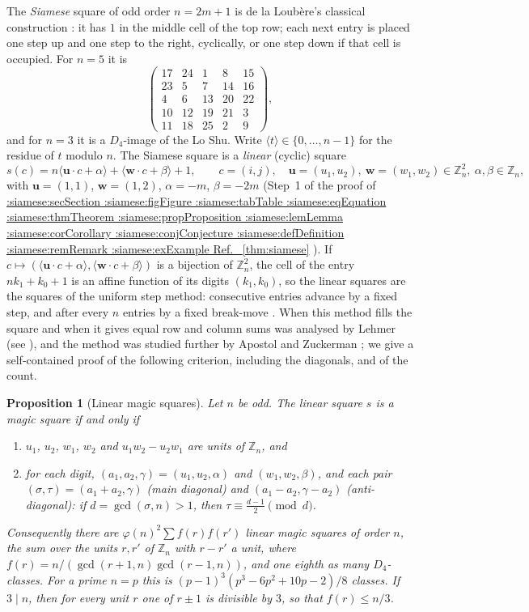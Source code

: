 \documentclass[11pt,a4paper]{article}
\makeatletter
\def\Cref@getprefix#1:#2\relax{#1}
\def\Cref@prefix@sec{sec}
\def\Cref@prefix@fig{fig}
\def\Cref@prefix@tab{tab}
\def\Cref@prefix@eq{eq}
\def\Cref@prefix@thm{thm}
\def\Cref@prefix@prop{prop}
\def\Cref@prefix@lem{lem}
\def\Cref@prefix@cor{cor}
\def\Cref@prefix@conj{conj}
\def\Cref@prefix@def{def}
\def\Cref@prefix@rem{rem}
\def\Cref@prefix@ex{ex}
\def\Cref@type@cap#1{%
  \edef\Cref@tmp{#1}%
  \ifx\Cref@tmp\Cref@prefix@sec Section%
  \else\ifx\Cref@tmp\Cref@prefix@fig Figure%
  \else\ifx\Cref@tmp\Cref@prefix@tab Table%
  \else\ifx\Cref@tmp\Cref@prefix@eq Equation%
  \else\ifx\Cref@tmp\Cref@prefix@thm Theorem%
  \else\ifx\Cref@tmp\Cref@prefix@prop Proposition%
  \else\ifx\Cref@tmp\Cref@prefix@lem Lemma%
  \else\ifx\Cref@tmp\Cref@prefix@cor Corollary%
  \else\ifx\Cref@tmp\Cref@prefix@conj Conjecture%
  \else\ifx\Cref@tmp\Cref@prefix@def Definition%
  \else\ifx\Cref@tmp\Cref@prefix@rem Remark%
  \else\ifx\Cref@tmp\Cref@prefix@ex Example%
  \else Ref.%
  \fi\fi\fi\fi\fi\fi\fi\fi\fi\fi\fi\fi
}
\DeclareRobustCommand{\Cref}[1]{%
  \begingroup
  \edef\Cref@label{#1}%
  \edef\Cref@prefix{\expandafter\Cref@getprefix\Cref@label:\relax}%
  \hyperref[#1]{\Cref@type@cap{\Cref@prefix}~\ref*{#1}}%
  \endgroup
}
\theoremstyle{plain}
\newtheorem{proposition}[theorem]{Proposition}
\theoremstyle{definition}
\theoremstyle{remark}
\newcommand{\Z}{\mathbb{Z}}
\makeatother
\begin{document}
The \emph{Siamese} square of odd order $n=2m+1$ is de la Loub\`ere's classical construction \cite{loubere1693}: it has $1$ in the middle cell of the top row; each next entry is placed one step up and one step to the right, cyclically, or one step down if that cell is occupied.
For $n=5$ it is
\[
\begin{pmatrix}17&24&1&8&15\\23&5&7&14&16\\4&6&13&20&22\\10&12&19&21&3\\11&18&25&2&9\end{pmatrix},
\]
and for $n=3$ it is a $D_4$-image of the Lo Shu.
Write $\langle t\rangle\in\{0,\dots,n-1\}$ for the residue of $t$ modulo $n$.
The Siamese square is a \emph{linear} (cyclic) square
\[
s(c)=n\langle\mathbf u\cdot c+\alpha\rangle+\langle\mathbf w\cdot c+\beta\rangle+1,\qquad c=(i,j),\quad \mathbf u=(u_1,u_2),\ \mathbf w=(w_1,w_2)\in\Z_n^2,\ \alpha,\beta\in\Z_n,
\]
with $\mathbf u=(1,1)$, $\mathbf w=(1,2)$, $\alpha=-m$, $\beta=-2m$ (Step~1 of the proof of \Cref{thm:siamese}).
If $c\mapsto(\langle\mathbf u\cdot c+\alpha\rangle,\langle\mathbf w\cdot c+\beta\rangle)$ is a bijection of $\Z_n^2$, the cell of the entry $nk_1+k_0+1$ is an affine function of its digits $(k_1,k_0)$, so the linear squares are the squares of the uniform step method: consecutive entries advance by a fixed step, and after every $n$ entries by a fixed break-move \cite[Ch.~I]{andrews1960magic}.
When this method fills the square and when it gives equal row and column sums was analysed by Lehmer \cite{lehmer1929} (see \cite{travassos2013}), and the method was studied further by Apostol and Zuckerman \cite{apostol1951}; we give a self-contained proof of the following criterion, including the diagonals, and of the count.

\begin{proposition}[Linear magic squares]
\label{prop:linear-magic}
Let $n$ be odd. The linear square $s$ is a magic square if and only if
\begin{enumerate}
\item[(a)] $u_1$, $u_2$, $w_1$, $w_2$ and $u_1w_2-u_2w_1$ are units of $\Z_n$, and
\item[(b)] for each digit, $(a_1,a_2,\gamma)=(u_1,u_2,\alpha)$ and $(w_1,w_2,\beta)$, and each pair $(\sigma,\tau)=(a_1+a_2,\gamma)$ (main diagonal) and $(a_1-a_2,\gamma-a_2)$ (anti-diagonal): if $d=\gcd(\sigma,n)>1$, then $\tau\equiv\frac{d-1}2\pmod d$.
\end{enumerate}
Consequently there are $\varphi(n)^2\sum f(r)f(r')$ linear magic squares of order $n$, the sum over the units $r,r'$ of $\Z_n$ with $r-r'$ a unit, where $f(r)=n/(\gcd(r+1,n)\gcd(r-1,n))$, and one eighth as many $D_4$-classes.
For a prime $n=p$ this is $(p-1)^3(p^3-6p^2+10p-2)/8$ classes.
If $3\mid n$, then for every unit $r$ one of $r\pm1$ is divisible by $3$, so that $f(r)\le n/3$.
\end{proposition}
\end{document}
